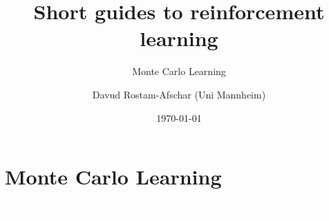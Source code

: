 \documentclass[11pt,table]{beamer}
\title[]{Short guides to reinforcement learning}
\subtitle[]{Monte Carlo Learning}
\author[D. Rostam-Afschar]{\textcolor{gray1}{Davud Rostam-Afschar (Uni Mannheim)}}
\date[]{\today}
\begin{document}
\begin{frame}[plain]
  \titlepage
\end{frame}


\section{Monte Carlo Learning}
{
\begin{frame}
\centering
\Huge
\textcolor{white}{How to learn from episodes?}
\thispagestyle{empty}
\end{frame}
}
\end{document}
